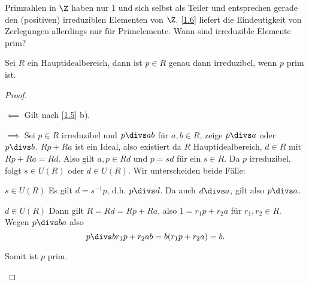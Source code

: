 Primzahlen in $\Z$ haben nur $1$ und sich selbst als Teiler und entsprechen gerade den (positiven) irreduziblen Elementen von $\Z$.
\ref{1.6} liefert die Eindeutigkeit von Zerlegungen allerdings nur für Primelemente.
Wann sind irreduzible Elemente prim?


\begin{lem} \label{1.7}
	Sei $R$ ein Hauptidealbereich, dann ist $p \in R$ genau dann irreduzibel, wenn $p$ prim ist.
	\begin{proof}
		\begin{segnb}{$\impliedby$}
			Gilt nach \ref{1.5} b).
		\end{segnb}
		\begin{segnb}{$\implies$}
			Sei $p \in R$ irreduzibel und $p \divs ab$ für $a, b \in R$, zeige $p \divs a$ oder $p \divs b$.
			$Rp + Ra$ ist ein Ideal, also existiert da $R$ Hauptidealbereich, $d \in R$ mit $Rp + Ra = Rd$.
			Also gilt $a,p \in Rd$ und $p = sd$ für ein $s \in R$.
			Da $p$ irreduzibel, folgt $s \in U(R)$ oder $d \in U(R)$.
			Wir unterscheiden beide Fälle:
			\begin{segnb}{$s\in U(R)$}
				Es gilt $d = s^{-1}p$, d.h. $p \divs d$.
				Da auch $d \divs a$, gilt also $p\divs a$.
			\end{segnb}
			\begin{segnb}{$d\in U(R)$}
				Dann gilt $R = Rd = Rp + Ra$, also $1 = r_1 p + r_2 a$ für $r_1, r_2 \in R$.
				Wegen $p \divs ba$ also
				\[
					p \divs
					b r_1 p + r_2 a b
					= b ( r_1 p + r_2 a)
					= b.
				\]
			\end{segnb}
			Somit ist $p$ prim.
		\end{segnb}
	\end{proof}
\end{lem}

